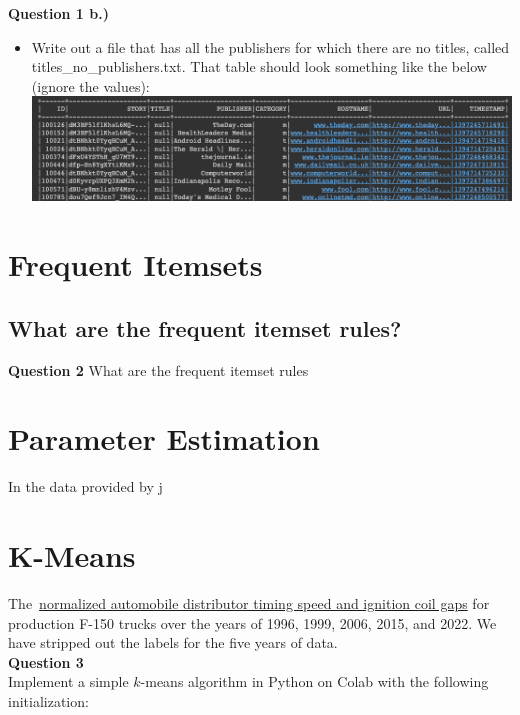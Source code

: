 \documentclass[paper=a4, fontsize=11pt]{scrartcl} %
\begin{document}
\textbf{Question 1 b.)}
\begin{itemize}
    \item Write out a file that has all the publishers for which there are no titles, called titles\_no\_publishers.txt. That table should look something like the below (ignore the values): \\
    \includegraphics[width=150mm]{images/title_no_pub.png}
\end{itemize}    

\section{Frequent Itemsets}
\subsection{What are the frequent itemset rules?}

\textbf{Question 2} What are the frequent itemset rules

\section{Parameter Estimation}

In the data provided by j

\section{K-Means}

The~\href{https://course.ccs.neu.edu/cs6220/homework-3/data/}{normalized automobile distributor timing speed and ignition coil gaps} for production F-150 trucks over the years of 1996, 1999, 2006, 2015, and 2022. We have stripped out the labels for the five years of data.\\

\textbf{Question 3} \\

Implement a simple $k$-means algorithm in Python on Colab with the following initialization:
\end{document}
